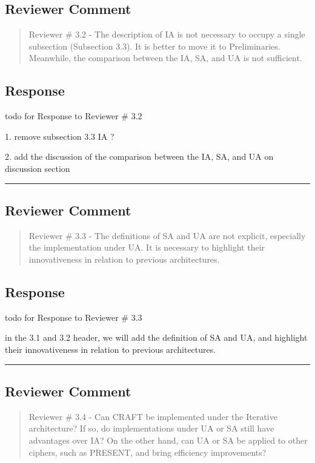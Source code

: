 \subsection{Reviewer Comment}
\begin{mdframed}
	\begin{quote}
		Reviewer \# 3.2 - The description of IA is not necessary to occupy a single subsection (Subsection 3.3). It is better to move it to Preliminaries. Meanwhile, the comparison between the IA, SA, and UA is not sufficient.
	\end{quote}
\end{mdframed}

\subsection{Response}

todo for Response to Reviewer \# 3.2

1. remove subsection 3.3 IA ?

2. add the discussion of the comparison between the IA, SA, and UA on discussion section 

\noindent\rule{\linewidth}{2.0pt}

\subsection{Reviewer Comment}
\begin{mdframed}
	\begin{quote}
		Reviewer \# 3.3 - The definitions of SA and UA are not explicit, especially the implementation under UA. It is necessary to highlight their innovativeness in relation to previous architectures.
	\end{quote}
\end{mdframed}

\subsection{Response}

todo for Response to Reviewer \# 3.3

in the 3.1 and 3.2 header, we will add the definition of SA and UA, and highlight their innovativeness in relation to previous architectures.

\noindent\rule{\linewidth}{2.0pt}

\subsection{Reviewer Comment}
\begin{mdframed}
	\begin{quote}
		Reviewer \# 3.4 - Can CRAFT be implemented under the Iterative architecture? If so, do implementations under UA or SA still have advantages over IA? On the other hand, can UA or SA be applied to other ciphers, such as PRESENT, and bring efficiency improvements?
	\end{quote}
\end{mdframed}

